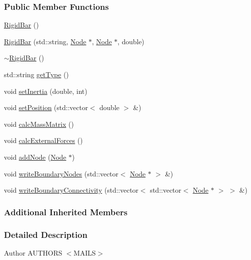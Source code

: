\subsubsection*{Public Member Functions}
\begin{DoxyCompactItemize}
\item 
\hyperlink{classmknix_1_1_rigid_bar_abb021e56fd2e7f7a098125e7de3db5e1}{Rigid\+Bar} ()
\item 
\hyperlink{classmknix_1_1_rigid_bar_ac47bc0c8fc15e799f67a76925b5919bf}{Rigid\+Bar} (std\+::string, \hyperlink{classmknix_1_1_node}{Node} $\ast$, \hyperlink{classmknix_1_1_node}{Node} $\ast$, double)
\item 
\hyperlink{classmknix_1_1_rigid_bar_aa349d4406824acbd0b29d25d9a2f2da4}{$\sim$\+Rigid\+Bar} ()
\item 
std\+::string \hyperlink{classmknix_1_1_rigid_bar_acc95a2895043626253a4bb8ee1eb341a}{get\+Type} ()
\item 
void \hyperlink{classmknix_1_1_rigid_bar_a0b125aafa37253d47041ba107f8eaed4}{set\+Inertia} (double, int)
\item 
void \hyperlink{classmknix_1_1_rigid_bar_a7cee7a990c62bdac1ebf6a90903a9e15}{set\+Position} (std\+::vector$<$ double $>$ \&)
\item 
void \hyperlink{classmknix_1_1_rigid_bar_a3d368a1a10b600179fbb7e901472c301}{calc\+Mass\+Matrix} ()
\item 
void \hyperlink{classmknix_1_1_rigid_bar_a4325fbe1df7832ce09bd2bf72b00cf67}{calc\+External\+Forces} ()
\item 
void \hyperlink{classmknix_1_1_rigid_bar_a1f05aae37c654229c4f6c3ef32944125}{add\+Node} (\hyperlink{classmknix_1_1_node}{Node} $\ast$)
\item 
void \hyperlink{classmknix_1_1_rigid_bar_af4249df4214337e0cd4a2ec2d4c328d0}{write\+Boundary\+Nodes} (std\+::vector$<$ \hyperlink{classmknix_1_1_node}{Node} $\ast$ $>$ \&)
\item 
void \hyperlink{classmknix_1_1_rigid_bar_a63d87541e4d285c879f313b835be6afd}{write\+Boundary\+Connectivity} (std\+::vector$<$ std\+::vector$<$ \hyperlink{classmknix_1_1_node}{Node} $\ast$ $>$ $>$ \&)
\end{DoxyCompactItemize}
\subsubsection*{Additional Inherited Members}


\subsubsection{Detailed Description}
\begin{DoxyAuthor}{Author}
A\+U\+T\+H\+O\+R\+S $<$\+M\+A\+I\+L\+S$>$ 
\end{DoxyAuthor}


